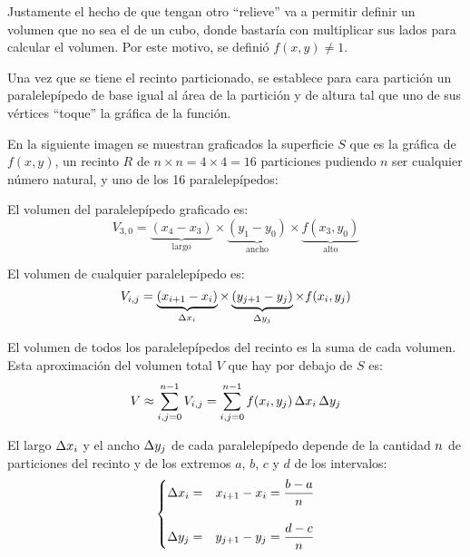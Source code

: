 Justamente el hecho de que tengan otro ``relieve'' va a permitir definir un volumen que no sea el de un cubo, donde bastaría con multiplicar sus lados para calcular el volumen.
Por este motivo, se definió $f(x,y) \neq 1$.

Una vez que se tiene el recinto particionado, se establece para cara partición un paralelepípedo de base igual al área de la partición y de altura tal que uno de sus vértices ``toque'' la gráfica de la función.

En la siguiente imagen se muestran graficados la superficie $S$ que es la gráfica de $f(x,y)$, un recinto $R$ de $n \times n = 4 \times 4 = 16$ particiones pudiendo $n$ ser cualquier número natural, y uno de los 16 paralelepípedos:

\begin{center}
    \def\svgwidth{0.6\linewidth}
    
\end{center}

El volumen del paralelepípedo graficado es:
\begin{equation*}
    V_{3,0}= \underbrace{(x_4-x_3)}_{\textrm{largo}} \times \underbrace{(y_1-y_0)}_{\textrm{ancho}} \times \underbrace{f(x_3,y_0)}_{\textrm{alto}}
\end{equation*}

El volumen de cualquier paralelepípedo es:
\begin{equation*}
    V_{i,j}= \underbrace{(x_{i+1} - x_i)}_{\Delta x_i} \times \underbrace{(y_{j+1} - y_j)}_{\Delta y_j} \times f(x_i,y_j)
\end{equation*}

El volumen de todos los paralelepípedos del recinto es la suma de cada volumen.
Esta aproximación del volumen total $V$ que hay por debajo de $S$ es:
\begin{equation*}
    V \approx \sum_{i,j=0}^{n-1} V_{i,j} = \sum_{i,j=0}^{n-1} f(x_i,y_j) \, \Delta x_i \, \Delta y_j
\end{equation*}

El largo $\Delta x_i$ y el ancho $\Delta y_j$ de cada paralelepípedo depende de la cantidad $n$ de particiones del recinto y de los extremos $a$, $b$, $c$ y $d$ de los intervalos:
\begin{equation*}
    \left\{
    \begin{aligned}
        \Delta x_i &=& x_{i+1} - x_i = \dfrac{b-a}{n}
        \\[1em]
        \Delta y_j &=& y_{j+1} - y_j = \dfrac{d-c}{n}
    \end{aligned}
    \right.
\end{equation*}

